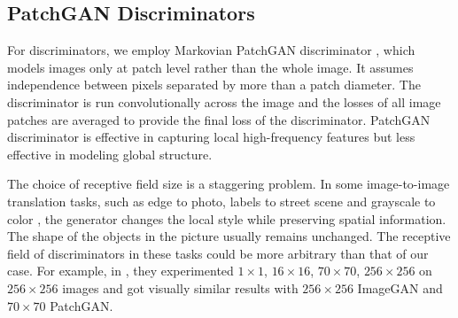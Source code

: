 \documentclass[letterpaper]{article} %
\newcommand{\zhiming}[1]{{\bf \color{blue} [Zhiming says: #1]}}
\begin{document}
	
	
	
	\subsection{PatchGAN Discriminators}
	For discriminators, we employ Markovian PatchGAN discriminator \cite{isola2016image,li2016precomputed},
	which models images only at patch level rather than the whole image. It assumes independence between pixels separated by more than a patch diameter. The discriminator is run convolutionally across the image and the losses of all image patches are averaged to provide the final loss of the discriminator. 
	PatchGAN discriminator is effective in capturing local high-frequency features but less effective in modeling global structure. 
	
	The choice of receptive field size is a staggering problem. In some image-to-image translation tasks, such as edge to photo, labels to street scene and grayscale to color \cite{isola2016image}, the generator changes the local style while preserving spatial information. The shape of the objects in the picture usually remains unchanged. The receptive field of discriminators in these tasks could be more arbitrary than that of our case. For example, in \cite{isola2016image}, they experimented $1\times1$, $16\times16$, $70\times70$, $256\times256$ on $256\times256$ images and got visually similar results with $256\times256$ ImageGAN and $70\times70$ PatchGAN.
	
\end{document}
